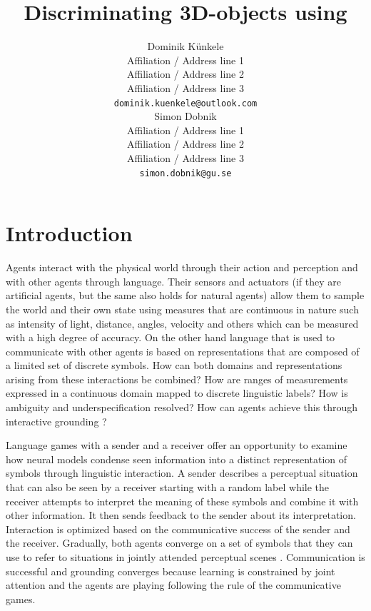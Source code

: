\documentclass[11pt]{article}
\title{Discriminating 3D-objects using }
\author{Dominik Künkele \\
  Affiliation / Address line 1 \\
  Affiliation / Address line 2 \\
  Affiliation / Address line 3 \\
  \texttt{dominik.kuenkele@outlook.com} \\\And
  Simon Dobnik \\
  Affiliation / Address line 1 \\
  Affiliation / Address line 2 \\
  Affiliation / Address line 3 \\
  \texttt{simon.dobnik@gu.se} \\}
\begin{document}
\maketitle
\begin{abstract}

\end{abstract}

\section{Introduction}

Agents interact with the physical world through their action and perception and with other agents through language.
Their sensors and actuators (if they are artificial agents, but the same also holds for natural agents) allow them to sample the world and their own state using measures that are continuous in nature such as intensity of light, distance, angles, velocity and others which can be measured with a high degree of accuracy.
On the other hand language that is used to communicate with other agents is based on representations that are composed of a limited set of discrete symbols.
How can both domains and representations arising from these interactions be combined? How are ranges of measurements expressed in a continuous domain mapped to discrete linguistic labels?
How is ambiguity and underspecification resolved?
How can agents achieve this through interactive grounding \citep{Regier:1996,Roy:2005,Cooper:2023aa}?



Language games with a sender and a receiver \citep{Clark:1996aa,Bartlett:2005aa,Kirby:2008ab,SteelsLoetzsch:2009,Zaslavsky:2018aa} offer an opportunity to examine how neural models condense seen information into a distinct representation of symbols through linguistic interaction.
A sender describes a perceptual situation that can also be seen by a receiver starting with a random label while
the receiver attempts to interpret the meaning of these symbols and combine it with other information.
It then sends feedback to the sender about its interpretation.
Interaction is optimized based on the communicative success of the sender and the receiver.
Gradually, both agents converge on a set of symbols that they can use to refer to situations in jointly attended perceptual scenes \citep{Chai:2016aa, Kelleher2020}.
Communication is successful and grounding converges because learning is constrained by joint attention and the agents are playing following the rule of the communicative games.
\end{document}
